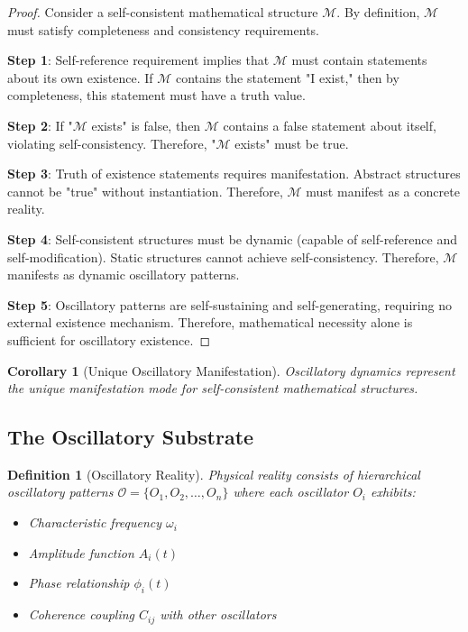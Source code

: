 \documentclass[11pt]{article}
\newtheorem{corollary}[theorem]{Corollary}
\newtheorem{definition}[theorem]{Definition}
\theoremstyle{remark}
\begin{document}
\begin{proof}
Consider a self-consistent mathematical structure $\mathcal{M}$. By definition, $\mathcal{M}$ must satisfy completeness and consistency requirements. 

\textbf{Step 1}: Self-reference requirement implies that $\mathcal{M}$ must contain statements about its own existence. If $\mathcal{M}$ contains the statement "I exist," then by completeness, this statement must have a truth value.

\textbf{Step 2}: If "$\mathcal{M}$ exists" is false, then $\mathcal{M}$ contains a false statement about itself, violating self-consistency. Therefore, "$\mathcal{M}$ exists" must be true.

\textbf{Step 3}: Truth of existence statements requires manifestation. Abstract structures cannot be "true" without instantiation. Therefore, $\mathcal{M}$ must manifest as a concrete reality.

\textbf{Step 4}: Self-consistent structures must be dynamic (capable of self-reference and self-modification). Static structures cannot achieve self-consistency. Therefore, $\mathcal{M}$ manifests as dynamic oscillatory patterns.

\textbf{Step 5}: Oscillatory patterns are self-sustaining and self-generating, requiring no external existence mechanism. Therefore, mathematical necessity alone is sufficient for oscillatory existence.
\end{proof}

\begin{corollary}[Unique Oscillatory Manifestation]
Oscillatory dynamics represent the unique manifestation mode for self-consistent mathematical structures.
\end{corollary}

\subsection{The Oscillatory Substrate}

\begin{definition}[Oscillatory Reality]
Physical reality consists of hierarchical oscillatory patterns $\mathcal{O} = \{O_1, O_2, \ldots, O_n\}$ where each oscillator $O_i$ exhibits:
\begin{itemize}
\item Characteristic frequency $\omega_i$
\item Amplitude function $A_i(t)$
\item Phase relationship $\phi_i(t)$
\item Coherence coupling $C_{ij}$ with other oscillators
\end{itemize}
\end{definition}
\end{document}
